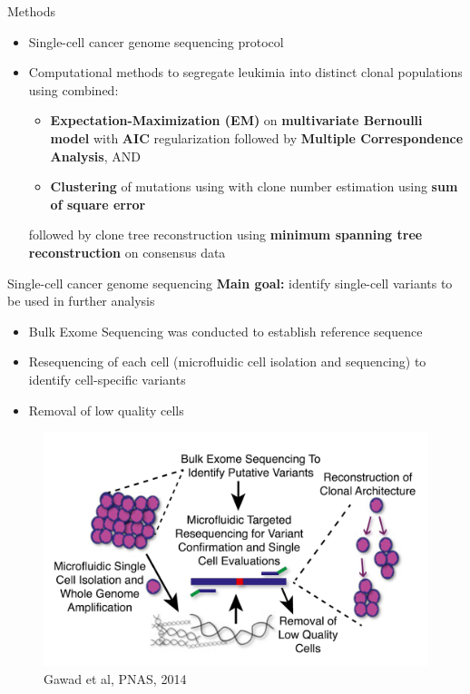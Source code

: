 \documentclass[pdf, aspectratio=169]{beamer}
\begin{document}
\begin{frame}{Methods}
	\begin{itemize}
		\item Single-cell cancer genome sequencing protocol
		\item Computational methods to segregate leukimia into distinct clonal populations using combined:
		\begin{itemize}
			\item \textbf{Expectation-Maximization (EM)} on \textbf{multivariate Bernoulli model} with \textbf{AIC} regularization followed by \textbf{Multiple Correspondence Analysis}, AND
			\item \textbf{Clustering} of  mutations using  with clone number estimation using \textbf{sum of square error} 
		\end{itemize}
		followed by clone tree reconstruction using \textbf{minimum spanning tree reconstruction} on consensus data 
	\end{itemize}
\end{frame}

\begin{frame}{Single-cell cancer genome sequencing}
	\textbf{Main goal:} identify single-cell variants to be used in further analysis
	\begin{itemize}
		\item Bulk Exome Sequencing was conducted to establish reference sequence
		\item Resequencing of each cell (microfluidic cell isolation and sequencing) to identify cell-specific variants
		\item Removal of low quality cells
	\end{itemize}
	
	\begin{figure}
		\center
		\includegraphics[scale=.2]{03.png}
		{\tiny Gawad et al, PNAS, 2014}
	\end{figure}
\end{frame}
\end{document}
